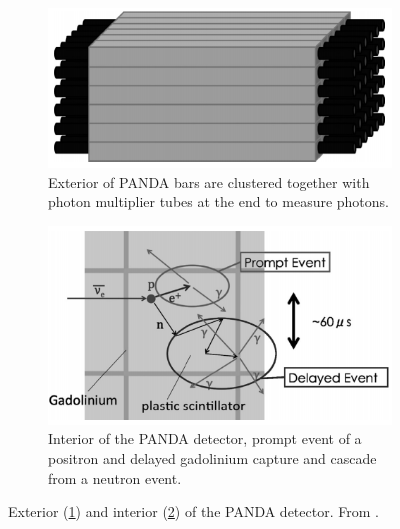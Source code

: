 \begin{figure}[htbp]
\centering
\begin{subfigure}{.5\textwidth}
  \centering
  \includegraphics[width=\linewidth]{Chapter2/Figs/Raster/Panda_far.png}
  \captionsetup{width=.9\linewidth}
  \caption{Exterior of PANDA bars are clustered together with photon multiplier tubes at the end to measure photons.}
  \label{subFig:pandaFar}
\end{subfigure}%
\begin{subfigure}{.5\textwidth}
  \centering
\includegraphics[width=\linewidth]{Chapter2/Figs/Raster/Panda_close.png}
  \captionsetup{width=.9\linewidth}
  \caption{Interior of the PANDA detector, prompt event of a positron and delayed gadolinium capture and cascade from a neutron event.}
  \label{subFig:pandaClose}
\end{subfigure}
\caption{Exterior (\ref{subFig:pandaFar}) and interior (\ref{subFig:pandaClose}) of the PANDA detector. From \cite{PANDA_2014}.}
\label{fig:pandaCloseFar}
\end{figure}

